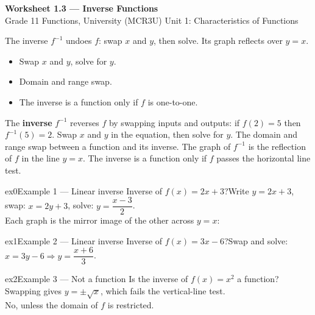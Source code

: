 \documentclass[11pt]{article}
\begin{document}
\begin{center}
{\LARGE\bfseries\color{titleblue}Worksheet 1.3 --- Inverse Functions}\\[2pt]
{\small Grade 11 Functions, University (MCR3U) \textperiodcentered{} Unit 1: Characteristics of Functions}
\end{center}

\begin{ideabox}
The inverse $f^{-1}$ undoes $f$: swap $x$ and $y$, then solve. Its graph reflects over $y=x$.
\begin{itemize}[leftmargin=*,itemsep=2pt]
  \item Swap $x$ and $y$, solve for $y$.
  \item Domain and range swap.
  \item The inverse is a function only if $f$ is one-to-one.
\end{itemize}
\end{ideabox}

\begin{learnbox}
The \textbf{inverse} $f^{-1}$ reverses $f$ by swapping inputs and outputs: if $f(2)=5$ then $f^{-1}(5)=2$.
Swap $x$ and $y$ in the equation, then solve for $y$. The domain and range swap between a function and its inverse.
The graph of $f^{-1}$ is the reflection of $f$ in the line $y=x$. The inverse is a function only if $f$ passes the horizontal line test.
\end{learnbox}


\begin{example}{ex0}{Example 1 --- Linear inverse}
Inverse of $f(x)=2x+3$?\soln Write $y=2x+3$, swap: $x=2y+3$, solve: $y=\dfrac{x-3}{2}$. \\ Each graph is the mirror image of the other across $y=x$:
\end{example}

\begin{example}{ex1}{Example 2 --- Linear inverse}
Inverse of $f(x)=3x-6$?\soln Swap and solve: $x=3y-6\Rightarrow y=\dfrac{x+6}{3}$.
\end{example}

\begin{example}{ex2}{Example 3 --- Not a function}
Is the inverse of $f(x)=x^2$ a function?\soln Swapping gives $y=\pm\sqrt{x}$, which fails the vertical-line test. \\ No, unless the domain of $f$ is restricted.
\end{example}
\end{document}
